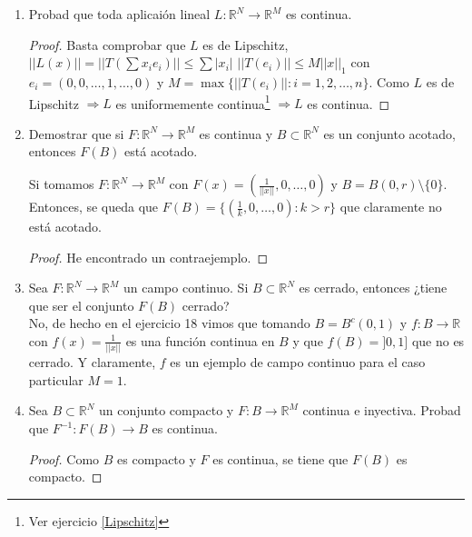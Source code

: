 \documentclass[a4paper, 11pt]{article} %
\begin{document}
\begin{enumerate}
\begin{proof}
		$\forall x' \in \{x \in \mathbb{R}: F(x) \neq 0\}$, por la definición de abierto\footnote{<<Se dice que un conjunto $A \subset E$ es abierto en el espacio métrico $(E,d)$ si $\forall x \in A$ $\exists r_x > 0$ / $B(x,r_x) \subset A$.>>}, podemos tomar un $r_{x'}$ / $B(x',r_{x'}) \subset \{x \in \mathbb{R}: F(x) \neq 0\} \Rightarrow \forall y \in B(x',r_{x'})$, se tiene que $F(y) \neq 0$.
		
		Entonces, trivialmente se cumple para $x_0 \subset \{x \in \mathbb{R}: F(x) \neq 0\} \cap A \subset \{x \in \mathbb{R}: F(x) \neq 0\}$ y basta tomar $U = B(x_0, r_{x_0})$.
	\end{proof}
	\item Probad que toda aplicaión lineal $L: \mathbb{R}^N \rightarrow \mathbb{R}^M$ es continua.
	\begin{proof}
		Basta comprobar que $L$ es de Lipschitz, $||L(x)|| = ||T(\sum x_ie_i)|| \le \sum |x_i|$ $||T(e_i)|| \le M ||x||_1$ con $e_i=(0,0,\dots,1,\dots,0)$ y $M = \max\{||T(e_i)||: i=1,2,\dots,n \}$.
		Como $L$ es de Lipschitz $\Rightarrow L$ es uniformemente continua\footnote{Ver ejercicio \ref{Lipschitz}} $\Rightarrow L$ es continua.
	\end{proof}
	\item Demostrar que si $F: \mathbb{R}^N \rightarrow \mathbb{R}^M$ es continua y $B \subset \mathbb{R}^N$ es un conjunto acotado, entonces $F(B)$ está acotado.
	
	Si tomamos $F: \mathbb{R}^N \rightarrow \mathbb{R}^M$ con $F(x) = \left(\displaystyle{\frac{1}{||x||}},0,\dots,0\right)$ y $B = B(0,r)\setminus \{0\}$.
	Entonces, se queda que $F(B)=\displaystyle{\{\left(\frac{1}{k},0,\dots,0\right): k > r\}}$ que claramente no está acotado.
	
	\begin{proof}
		He encontrado un contraejemplo.
	\end{proof}
	\item Sea $F: \mathbb{R}^N \rightarrow \mathbb{R}^M$ un campo continuo. Si $B \subset \mathbb{R}^N$ es cerrado, entonces ¿tiene que ser el conjunto $F(B)$ cerrado?\\
	No, de hecho en el ejercicio 18 vimos que tomando $B=B^c(0,1)$ y $f:B \rightarrow \mathbb{R}$ con $\displaystyle{f(x) = \frac{1}{||x||}}$ es una función continua en $B$ y que $f(B) = ]0,1]$ que no es cerrado. Y claramente, $f$ es un ejemplo de campo continuo para el caso particular $M=1$.
	\item Sea $B \subset \mathbb{R}^N$ un conjunto compacto y $F: B \rightarrow \mathbb{R}^M$ continua e inyectiva. Probad que $F^{-1}: F(B) \rightarrow B$ es continua.
	\begin{proof}
		Como $B$ es compacto y $F$ es continua, se tiene que $F(B)$ es compacto.
		

\end{proof}
\end{enumerate}
\end{document}
